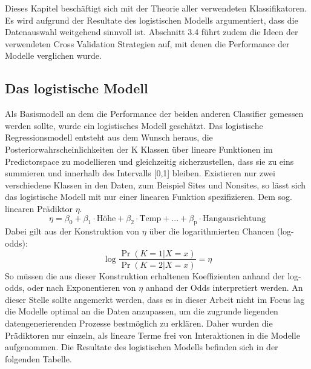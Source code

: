 Dieses Kapitel beschäftigt sich mit der Theorie aller verwendeten Klassifikatoren. Es wird aufgrund der Resultate des logistischen Modells argumentiert, dass die Datenauswahl weitgehend sinnvoll ist. Abschnitt 3.4 führt zudem die Ideen der verwendeten Cross Validation Strategien auf, mit denen die Performance der Modelle verglichen wurde. 

\subsection{Das logistische Modell}
Als Basismodell an dem die Performance der beiden anderen Classifier gemessen werden sollte, wurde ein logistisches Modell geschätzt. Das logistische Regressionsmodell entsteht aus dem Wunsch heraus, die Posteriorwahrscheinlichkeiten der K Klassen über lineare Funktionen im Predictorspace zu modellieren und gleichzeitig sicherzustellen, dass sie zu eins summieren und innerhalb des Intervalls [0,1] bleiben. \cite{logit}
Existieren nur zwei verschiedene Klassen in den Daten, zum Beispiel Sites und Nonsites, so lässt sich das logistische Modell mit nur einer linearen Funktion spezifizieren. Dem sog. linearen Prädiktor $\eta$. \\
\begin{equation}
    \eta = \beta_{\text{0}} + \beta_{\text{1}} \cdot {\text{Höhe}}  + \beta_{\text{2}} \cdot  {\text{Temp}}  + ... + \beta_{\text{p}} \cdot {\text{Hangausrichtung}} 
\label{eqlogit}
\end{equation}
Dabei gilt aus der Konstruktion von $\eta$ über die logarithmierten Chancen (log-odds):\\ 
\begin{equation}
\log \frac{\operatorname{Pr}(K=1 | X=x)}{\operatorname{Pr}(K=2 | X=x)}= \eta
\label{logodds}
\end{equation}
So müssen die aus dieser Konstruktion erhaltenen Koeffizienten anhand der log-odds, oder nach Exponentieren von $\eta$ anhand der Odds interpretiert werden. An dieser Stelle sollte angemerkt werden, dass es in dieser Arbeit nicht im Focus lag die Modelle optimal an die Daten anzupassen, um die zugrunde liegenden datengenerierenden Prozesse bestmöglich zu erklären. Daher wurden die Prädiktoren nur einzeln, als lineare Terme frei von Interaktionen in die Modelle aufgenommen. Die Resultate des logistischen Modells befinden sich in der folgenden Tabelle. 
